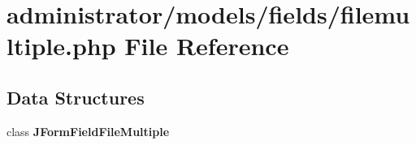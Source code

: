 \section{administrator/models/fields/filemultiple.php File Reference}
\label{administrator_2models_2fields_2filemultiple_8php}
\subsection*{Data Structures}
\begin{DoxyCompactItemize}
\item 
class \textbf{ J\+Form\+Field\+File\+Multiple}
\end{DoxyCompactItemize}
